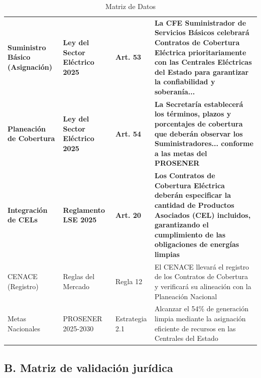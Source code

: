 \documentclass{cel}
\begin{document}
\vspace{0.3cm}
\begin{tabladoradoLargo}
\renewcommand{\tabularxcolumn}[1]{p{#1}}
\begin{xltabular}{\textwidth}{|X|X|X|X|}
\caption{Matriz de Datos} \\
\toprule
{}  &  &  &  \\
\midrule
\endhead
\textbf{Suministro Básico (Asignación)} & \textbf{Ley del Sector Eléctrico 2025} & \textbf{Art. 53} & \textbf{\textquotedbl{}La CFE Suministrador de Servicios Básicos celebrará Contratos de Cobertura Eléctrica prioritariamente con las Centrales Eléctricas del Estado para garantizar la confiabilidad y soberanía...\textquotedbl{}} \\ \hline
\textbf{Planeación de Cobertura} & \textbf{Ley del Sector Eléctrico 2025} & \textbf{Art. 54} & \textbf{\textquotedbl{}La Secretaría establecerá los términos, plazos y porcentajes de cobertura que deberán observar los Suministradores... conforme a las metas del PROSENER\textquotedbl{}} \\ \hline
\textbf{Integración de CELs} & \textbf{Reglamento LSE 2025} & \textbf{Art. 20} & \textbf{\textquotedbl{}Los Contratos de Cobertura Eléctrica deberán especificar la cantidad de Productos Asociados (CEL) incluidos, garantizando el cumplimiento de las obligaciones de energías limpias\textquotedbl{}} \\ \hline
CENACE (Registro) & Reglas del Mercado & Regla 12 & \textquotedbl{}El CENACE llevará el registro de los Contratos de Cobertura y verificará su alineación con la Planeación Nacional\textquotedbl{} \\ \hline
Metas Nacionales & PROSENER 2025-2030 & Estrategia 2.1 & \textquotedbl{}Alcanzar el 54\% de generación limpia mediante la asignación eficiente de recursos en las Centrales del Estado\textquotedbl{} \\ \hline
\bottomrule
\end{xltabular}
\end{tabladoradoLargo}

\vspace{0.4cm}
\subsection{B. Matriz de validación jurídica}
\nopagebreak
\end{document}
